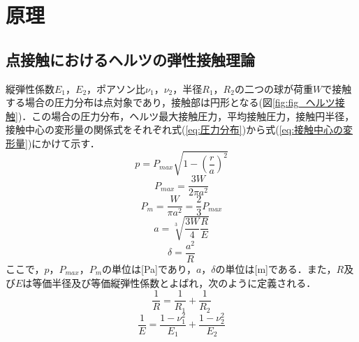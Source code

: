 \section{原理}

\subsection{点接触におけるヘルツの弾性接触理論}
縦弾性係数$E_1$，$E_2$，ポアソン比$\nu_1$，$\nu_2$，半径$R_1$，$R_2$の二つの球が荷重$W$で接触する場合の圧力分布は点対象であり，接触部は円形となる(図\ref{fig:fig_ヘルツ接触})．この場合の圧力分布，ヘルツ最大接触圧力，平均接触圧力，接触円半径，接触中心の変形量の関係式をそれぞれ式(\ref{eq:圧力分布})から式(\ref{eq:接触中心の変形量})にかけて示す．
\begin{equation}
    \label{eq:圧力分布}
    p = P_{max}\sqrt{1 - (\frac{r}{a})^2}
\end{equation}
\begin{equation}
    \label{eq:最大接触圧力}
    P_{max} = \frac{3W}{2\pi a^2}
\end{equation}
\begin{equation}
    \label{eq:平均接触圧力}
    P_{m} = \frac{W}{\pi a^2} = \frac{2}{3}P_{max}
\end{equation}
\begin{equation}
    \label{eq:接触円半径}
    a = \sqrt[3]{\frac{3W}{4} \frac{R}{E}}
\end{equation}
\begin{equation}
    \label{eq:接触中心の変形量}
    \delta = \frac{a^2}{R}
\end{equation}
ここで，$p$，$P_{max}$，$P_{m}$の単位は[Pa]であり，$a$，$\delta$の単位は[m]である．また，$R$及び$E$は等価半径及び等価縦弾性係数とよばれ，次のように定義される．
\begin{equation}
    \label{eq:等価半径}
    \frac{1}{R} = \frac{1}{R_1} + \frac{1}{R_2}
\end{equation}
\begin{equation}
    \label{eq:等価縦弾性係数}
    \frac{1}{E} = \frac{1 - \nu_1^2}{E_1} + \frac{1 - \nu_2^2}{E_2}
\end{equation}
